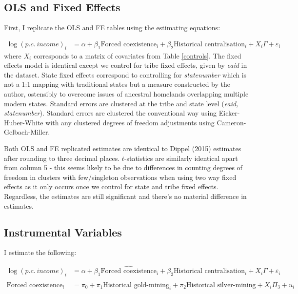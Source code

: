 \documentclass{article}
\begin{document}
\subsection{ OLS and Fixed Effects}
First, I replicate the OLS and FE tables using the estimating equations:

\begin{align*}
    \log(p.c. \ income)_i &= \alpha + \beta_1 \text{Forced coexistence}_i   + \beta_2 \text{Historical centralisation}_i + X_i \Gamma  + \varepsilon_i
\end{align*}
 where $X_i$ corresponds to a matrix of covariates from Table \ref{controls}. The 
 fixed effects model is identical except we control for tribe fixed effects, given by \textit{eaid} in the dataset. State fixed 
 effects correspond to controlling for \textit{statenumber} which is not a 1:1 mapping with traditional states but a measure 
 constructed by the author, ostensibly to overcome issues of ancestral homelands overlapping multiple modern states. Standard 
 errors are clustered at the tribe and state level (\textit{eaid, statenumber}). Standard errors are clustered the conventional way using 
 Eicker-Huber-White with any clustered degrees of freedom adjustments using Cameron-Gelbach-Miller.





% 
% 




Both OLS and FE replicated estimates are identical to Dippel (2015) estimates 
after rounding to three decimal places. $t$-statistics are similarly identical apart 
from column 5 - this seems likely to be due to differences in counting degrees of freedom in clusters
with few/singleton observations when using two way fixed effects as it only occurs once we control for state and tribe fixed effects. 
Regardless, the estimates are still significant and there's no material difference in estimates.

\subsection{Instrumental Variables}
I estimate the following:

\begin{align*}
    \log(p.c. \ income)_i &= \alpha + \beta_1 \widehat{\text{Forced coexistence}}_i   + \beta_2 \text{Historical centralisation}_i + X_i \Gamma  + \varepsilon_i \\ \\
\text{Forced coexistence}_i &= \pi_0 + \pi_1 \text{Historical gold-mining}_i + \pi_2 \text{Historical silver-mining} + X_i \Pi_3 + u_i
\end{align*}
\end{document}
